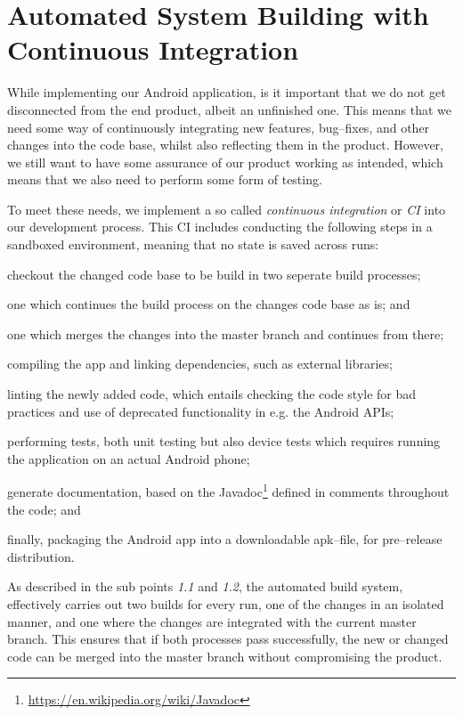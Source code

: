 \section{Automated System Building with Continuous Integration}
While implementing our Android application, is it important that we do not get disconnected from the end product, albeit an unfinished one.
This means that we need some way of continuously integrating new features, bug--fixes, and other changes into the code base, whilst also reflecting them in the product.
However, we still want to have some assurance of our product working as intended, which means that we also need to perform some form of testing.

\bigskip
To meet these needs, we implement a so called \textit{continuous integration} or \textit{CI} into our development process.
This CI includes conducting the following steps in a sandboxed environment, meaning that no state is saved across runs:
\begin{enumberate}
\item checkout the changed code base to be build in two seperate build processes;
\begin{enumberate}
    \item one which continues the build process on the changes code base as is; and
    \item one which merges the changes into the master branch and continues from there;
\end{enumberate}
\item compiling the app and linking dependencies, such as external libraries;
\item linting the newly added code, which entails checking the code style for bad practices and use of deprecated functionality in e.g. the Android APIs;
\item performing tests, both unit testing but also device tests which requires running the application on an actual Android phone;
\item generate documentation, based on the Javadoc\footnote{\url{https://en.wikipedia.org/wiki/Javadoc}} defined in comments throughout the code; and
\item finally, packaging the Android app into a downloadable apk--file, for pre--release distribution.
\end{enumberate}
As described in the sub points \textit{1.1} and \textit{1.2}, the automated build system, effectively carries out two builds for every run, one of the changes in an isolated manner, and one where the changes are integrated with the current master branch.
This ensures that if both processes pass successfully, the new or changed code can be merged into the master branch without compromising the product.

